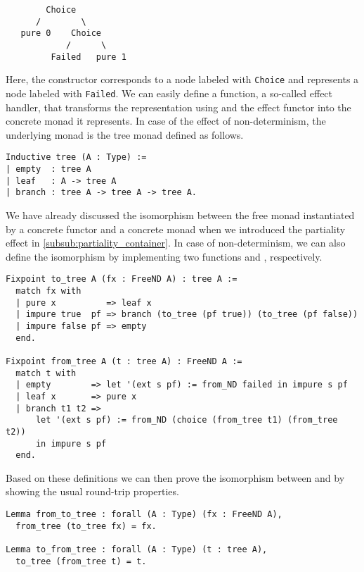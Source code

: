 \begin{verbatim}
        Choice
      /        \
   pure 0    Choice
            /      \
         Failed   pure 1
\end{verbatim}

Here, the constructor  corresponds to a node labeled
with \texttt{Choice} and  represents a node labeled
with \texttt{Failed}.
We can easily define a function, a so-called effect handler, that
transforms the representation using  and the effect functor
into the concrete monad it represents.
In case of the effect of non-determinism, the underlying monad is the
tree monad defined as follows.

\begin{verbatim}
Inductive tree (A : Type) :=
| empty  : tree A
| leaf   : A -> tree A
| branch : tree A -> tree A -> tree A.
\end{verbatim}

We have already discussed the isomorphism between the free monad
instantiated by a concrete functor and a concrete monad when we
introduced the partiality effect in
\autoref{subsub:partiality_container}.
In case of non-determinism, we can also define the isomorphism by
implementing two functions  and ,
respectively.

\begin{verbatim}
Fixpoint to_tree A (fx : FreeND A) : tree A :=
  match fx with
  | pure x          => leaf x
  | impure true  pf => branch (to_tree (pf true)) (to_tree (pf false))
  | impure false pf => empty
  end.

Fixpoint from_tree A (t : tree A) : FreeND A :=
  match t with
  | empty        => let '(ext s pf) := from_ND failed in impure s pf
  | leaf x       => pure x
  | branch t1 t2 =>
      let '(ext s pf) := from_ND (choice (from_tree t1) (from_tree t2))
      in impure s pf
  end.
\end{verbatim}

Based on these definitions we can then prove the isomorphism between
 and  by showing the usual round-trip
properties.

\begin{verbatim}
Lemma from_to_tree : forall (A : Type) (fx : FreeND A),
  from_tree (to_tree fx) = fx.

Lemma to_from_tree : forall (A : Type) (t : tree A),
  to_tree (from_tree t) = t.
\end{verbatim}

